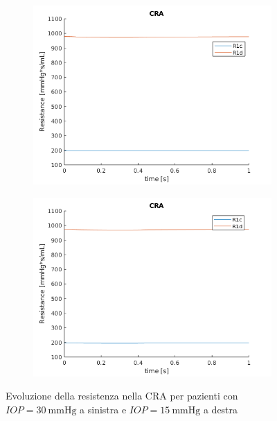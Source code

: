 \documentclass{article}
\begin{document}
\begin{figure}[h]
\begin{subfigure}{.5\textwidth}
  \centering
  \includegraphics[width=1.0\linewidth]{Pictures/IOP30_part1/CRA_30.png}
\end{subfigure}
\begin{subfigure}{.5\textwidth}
  \centering
  \includegraphics[width=1.0\linewidth]{Pictures/IOP15_part1/CRA_15.png}
\end{subfigure}
\caption{Evoluzione della resistenza nella CRA per pazienti con $IOP = \SI{30}{\mmHg}$ a sinistra e $IOP = \SI{15}{\mmHg}$ a destra}
\label{CRA1530}
\end{figure}
\end{document}
